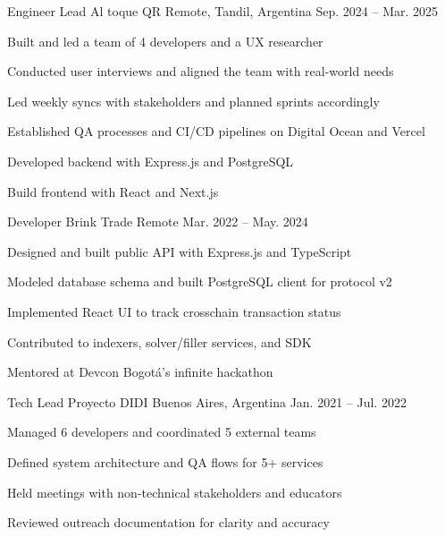 
\begin{cventries}

\cventry
{Engineer Lead} %
{Al toque QR} %
{Remote, Tandil, Argentina} %
{Sep. 2024 – Mar. 2025}
{
\begin{cvitems}
\item {Built and led a team of 4 developers and a UX researcher}
\item {Conducted user interviews and aligned the team with real-world needs}
\item {Led weekly syncs with stakeholders and planned sprints accordingly}
\item {Established QA processes and CI/CD pipelines on Digital Ocean and Vercel}
\item {Developed backend with Express.js and PostgreSQL}
\item {Build frontend with React and Next.js}
\end{cvitems}
}

\cventry
{Developer} %
{Brink Trade} %
{Remote} %
{Mar. 2022 – May. 2024}
{
\begin{cvitems}
\item {Designed and built public API with Express.js and TypeScript}
\item {Modeled database schema and built PostgreSQL client for protocol v2}
\item {Implemented React UI to track crosschain transaction status}
\item {Contributed to indexers, solver/filler services, and SDK}
\item {Mentored at Devcon Bogotá's infinite hackathon}
\end{cvitems}
}

\cventry
{Tech Lead} %
{Proyecto DIDI} %
{Buenos Aires, Argentina} %
{Jan. 2021 – Jul. 2022}
{
\begin{cvitems}
\item {Managed 6 developers and coordinated 5 external teams}
\item {Defined system architecture and QA flows for 5+ services}
\item {Held meetings with non-technical stakeholders and educators}
\item {Reviewed outreach documentation for clarity and accuracy}
\end{cvitems}
}


\end{cventries}
